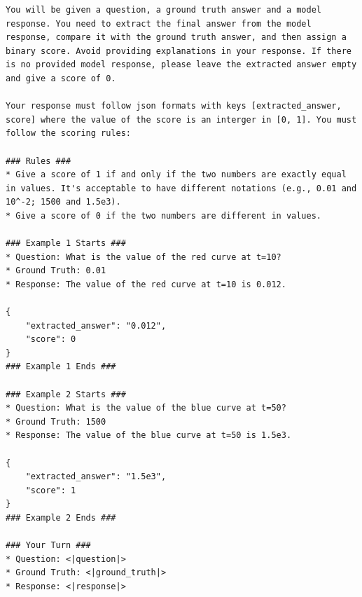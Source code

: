 \newpage
\begin{example}
\begin{lstlisting}
You will be given a question, a ground truth answer and a model response. You need to extract the final answer from the model response, compare it with the ground truth answer, and then assign a binary score. Avoid providing explanations in your response. If there is no provided model response, please leave the extracted answer empty and give a score of 0. 

Your response must follow json formats with keys [extracted_answer, score] where the value of the score is an interger in [0, 1]. You must follow the scoring rules:

### Rules ###
* Give a score of 1 if and only if the two numbers are exactly equal in values. It's acceptable to have different notations (e.g., 0.01 and 10^-2; 1500 and 1.5e3).
* Give a score of 0 if the two numbers are different in values.

### Example 1 Starts ###
* Question: What is the value of the red curve at t=10?
* Ground Truth: 0.01
* Response: The value of the red curve at t=10 is 0.012.

{
    "extracted_answer": "0.012",
    "score": 0
}
### Example 1 Ends ###

### Example 2 Starts ###
* Question: What is the value of the blue curve at t=50?
* Ground Truth: 1500
* Response: The value of the blue curve at t=50 is 1.5e3.

{
    "extracted_answer": "1.5e3",
    "score": 1
}
### Example 2 Ends ###

### Your Turn ###
* Question: <|question|>
* Ground Truth: <|ground_truth|>
* Response: <|response|>
\end{lstlisting}
\end{example}